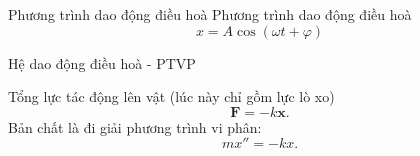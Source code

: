 \begin{frame}{Phương trình dao động điều hoà}
    Phương trình dao động điều hoà
    \begin{equation}
        x = A \cos{(\omega t +\varphi)}
        \label{eq:2.1_1}
    \end{equation}
    \vspace{5mm}
    
    \begin{center}
        \resizebox{0.7\linewidth}{!}{}
    \end{center}
\end{frame}

\begin{frame}{Hệ dao động điều hoà - PTVP}
    \begin{center}
        
    \end{center}
    Tổng lực tác động lên vật (lúc này chỉ gồm lực lò xo)
    \begin{equation*}
        \mathbf{F} = - k \mathbf{x}.
    \end{equation*}
    \pause
    Bản chất là đi giải phương trình vi phân:
    \begin{equation}
        m x'' = - k x.
        \label{eq:2.1_2}
    \end{equation}
\end{frame}